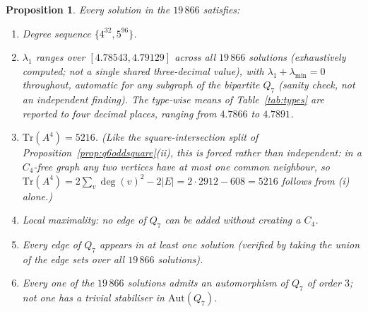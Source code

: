 \documentclass[12pt,a4paper]{article}
\newtheorem{proposition}[theorem]{Proposition}
\theoremstyle{definition}
\begin{document}
\begin{proposition}\label{prop:rigid}
Every solution in the $19\,866$ satisfies:
\begin{enumerate}[label=(\roman*)]
  \item Degree sequence $\{4^{32},5^{96}\}$.
  \item $\lambda_1$ ranges over $[4.78543,4.79129]$ across all $19\,866$
    solutions (exhaustively computed; not a single shared three-decimal
    value), with $\lambda_1+\lambda_{\min}=0$ throughout, automatic for any
    subgraph of the bipartite $Q_7$ (sanity check, not an independent
    finding). The type-wise means of Table~\ref{tab:types} are reported to four decimal
    places, ranging from $4.7866$ to $4.7891$.
  \item $\mathrm{Tr}(A^4)=5216$. (Like the square-intersection split of
    Proposition~\ref{prop:q6oddsquare}(ii), this is forced rather than
    independent: in a $C_4$-free graph any two vertices have at most one
    common neighbour, so
    $\mathrm{Tr}(A^4)=2\sum_v\deg(v)^2-2|E|=2\cdot2912-608=5216$ follows
    from (i) alone.)
  \item Local maximality: no edge of $Q_7$ can be added without creating a $C_4$.
  \item Every edge of $Q_7$ appears in at least one solution
    (verified by taking the union of the edge sets over all $19\,866$ solutions).
  \item \emph{Every} one of the $19\,866$ solutions admits an automorphism of
    $Q_7$ of order $3$; not one has a trivial stabiliser in
    $\mathrm{Aut}(Q_7)$.
\end{enumerate}
\end{proposition}
\end{document}
